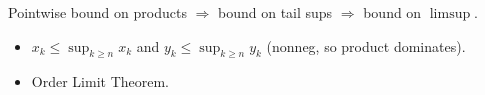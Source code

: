 \begin{remark*}
Pointwise bound on products $\Rightarrow$ bound on tail sups $\Rightarrow$ bound on $\limsup$.
\end{remark*}

\begin{remark*}[Dependencies]
\begin{itemize}
  \item $x_k \le \sup_{k \ge n} x_k$ and $y_k \le \sup_{k \ge n} y_k$ (nonneg, so product dominates).
  \item Order Limit Theorem.
\end{itemize}
\end{remark*}
